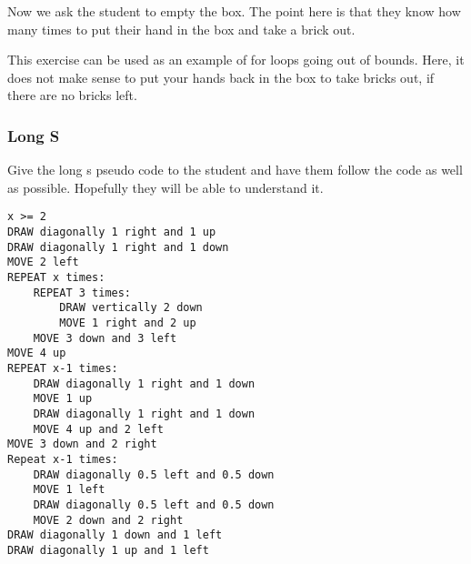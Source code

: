 Now we ask the student to empty the box. The point here is that they know how many times to put their hand in the box and take a brick out. 

This exercise can be used as an example of for loops going out of bounds. Here, it does not make sense to put your hands back in the box to take bricks out, if there are no bricks left. 


\subsubsection{Long S}
Give the long s pseudo code to the student and have them follow the code as well as possible. Hopefully they will be able to understand it. 
\begin{lstlisting}
x >= 2
DRAW diagonally 1 right and 1 up
DRAW diagonally 1 right and 1 down
MOVE 2 left
REPEAT x times:
    REPEAT 3 times:
        DRAW vertically 2 down
        MOVE 1 right and 2 up
    MOVE 3 down and 3 left 
MOVE 4 up
REPEAT x-1 times:
    DRAW diagonally 1 right and 1 down
	MOVE 1 up
    DRAW diagonally 1 right and 1 down
    MOVE 4 up and 2 left
MOVE 3 down and 2 right
Repeat x-1 times:
    DRAW diagonally 0.5 left and 0.5 down
	MOVE 1 left
    DRAW diagonally 0.5 left and 0.5 down
    MOVE 2 down and 2 right
DRAW diagonally 1 down and 1 left
DRAW diagonally 1 up and 1 left
\end{lstlisting}





